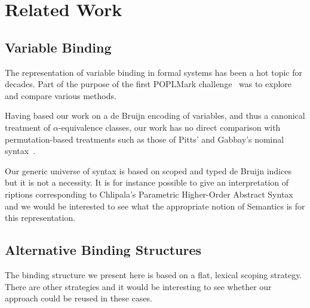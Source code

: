 {\begin{center}
\end{center}





\section{Related Work}\label{section:related-work}

\subsection{Variable Binding} The representation of variable binding
in formal systems has been a hot topic for decades. Part of the purpose
of the first POPLMark challenge~\citeyear{poplmark} was to explore and
compare various methods.

Having based our work on a de Bruijn encoding of variables, and thus a
canonical treatment of \(\alpha\)-equivalence classes, our work has no
direct comparison with permutation-based treatments such as those of
Pitts' and Gabbay's nominal syntax~\cite{gabbay:newaas-jv}.

Our generic universe of syntax is based on
scoped and typed de Bruijn indices~\cite{de1972lambda} but it is not
a necessity. It is for instance possible to give an interpretation
of riptions corresponding to Chlipala's Parametric Higher-Order
Abstract Syntax~\citeyear{chlipala2008parametric} and we would be interested
to see what the appropriate notion of Semantics is for this representation.

\subsection{Alternative Binding Structures} The binding structure we
present here is based on a flat, lexical scoping strategy. There are
other strategies and it would be interesting to see whether
our approach could be reused in these cases.

}
